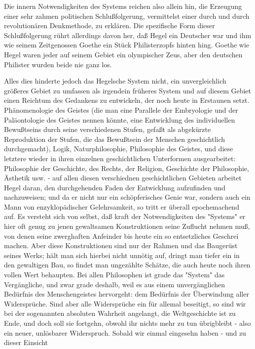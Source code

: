 Die innern Notwendigkeiten des Systems reichen also allein hin,
die Erzeugung einer sehr zahmen politischen Schlußfolgerung, vermittelst
einer durch und durch revolutionären Denkmethode, zu erklären. Die
spezifische Form dieser Schlußfolgerung rührt allerdings davon her, daß
Hegel ein Deutscher war und ihm wie seinem Zeitgenossen Goethe ein Stück
Philisterzopfs hinten hing. Goethe wie Hegel waren jeder auf seinem
Gebiet ein olympischer Zeus, aber den deutschen Philister wurden beide
nie ganz los.

Alles dies hinderte jedoch das Hegelsche System nicht, ein
unvergleichlich größeres Gebiet zu umfassen als irgendein früheres
System und auf diesem Gebiet einen Reichtum des Gedankens zu entwickeln,
der noch heute in Erstaunen setzt. Phänomenologie des Geistes (die man
eine Parallele der Embryologie und der Paläontologie des Geistes nennen
könnte, eine Entwicklung des individuellen Bewußtseins durch seine
verschiedenen Stufen, gefaßt als abgekürzte Reproduktion der Stufen, die
das Bewußtsein der Menschen geschichtlich durchgemacht), Logik,
Naturphilosophie, Philosophie des Geistes, und diese letztere wieder in
ihren einzelnen geschichtlichen Unterformen ausgearbeitet: Philosophie
der Geschichte, des Rechts, der Religion, Geschichte der Philosophie,
Ästhetik usw. - auf allen diesen verschiednen geschichtlichen Gebieten
arbeitet Hegel daran, den durchgehenden Faden der Entwicklung
aufzufinden und nachzuweisen; und da er nicht nur ein schöpferisches
Genie war, sondern auch ein Mann von enzyklopädischer Gelehrsamkeit, so
tritt er überall epochemachend auf. Es versteht sich von selbst, daß
kraft der Notwendigkeiten des "Systems" er hier oft genug zu jenen
gewaltsamen Konstruktionen seine Zuflucht nehmen muß, von denen seine
zwerghaften Anfeinder bis heute ein so entsetzliches Geschrei machen.
Aber diese Konstruktionen sind nur der Rahmen und das Baugerüst seines
Werks; hält man sich hierbei nicht unnötig auf, dringt man tiefer ein in
den gewaltigen Bau, so findet man ungezählte Schätze, die auch heute
noch ihren vollen Wert behaupten. Bei allen Philosophen ist grade das
"System" das Vergängliche, und zwar grade deshalb, weil es aus einem
unvergänglichen Bedürfnis des Menschengeistes hervorgeht: dem Bedürfnis
der Überwindung aller Widersprüche. Sind aber alle Widersprüche ein für
allemal beseitigt, so sind wir bei der sogenannten absoluten Wahrheit
angelangt, die Weltgeschichte ist zu Ende, und doch soll sie fortgehn,
obwohl ihr nichts mehr zu tun übrigbleibt - also ein neuer, unlösbarer
Widerspruch. Sobald wir einmal eingesehn haben - und zu dieser Einsicht
